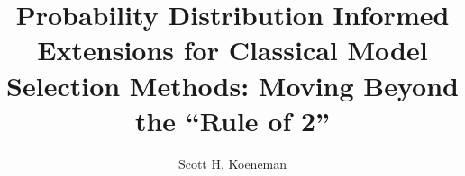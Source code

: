 

\titlepgtrue
\copyrighttrue %
\signaturepagetrue
\acktrue %
\dedicationtrue
\tablecontentstrue
\tablespagetrue
\figurespagetrue

\title{Probability Distribution Informed Extensions for Classical Model Selection Methods: Moving Beyond the ``Rule of 2''}
\author{Scott H. Koeneman}

\newcommand{\abstextwithesis}
{
Placeholder
}

\newcommand{\pubabstextwithesis}
{
Placeholder
}

\newcommand{\acknowledgement}
{
Placeholder
}

\newcommand{\dedication}
{
\begin{center}
\textit{To my mother and siblings,\\
for putting up with me for many years.}
\end{center}
}

\beforepreface
\afterpreface
